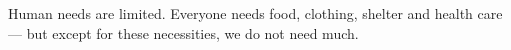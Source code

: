 Human needs are limited.
Everyone needs food, clothing, shelter and health care –-- but except for these necessities, we do not need much.